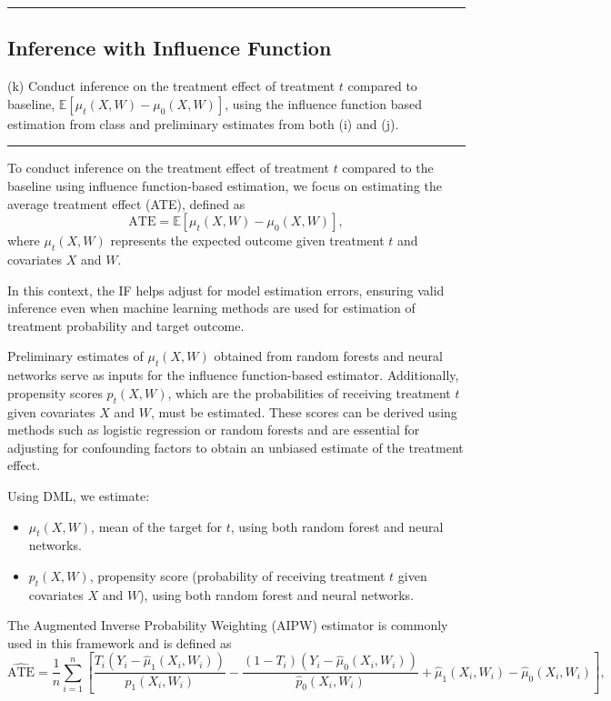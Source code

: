 \documentclass{article}
\newenvironment{colorparagraph}[1]{\par\color{#1}}{\par}
\begin{document}
\begin{colorparagraph}{questioncolor}
\label{q3k}
\rule{\textwidth}{0.5pt}
\subsection{Inference with Influence Function}
(k) Conduct inference on the treatment effect of treatment \( t \) compared to baseline, \( \mathbb{E}[\mu_t(X, W) - \mu_0(X, W)] \), using the influence function based estimation from class and preliminary estimates from both (i) and (j).

\rule{\textwidth}{0.5pt}
\end{colorparagraph}

To conduct inference on the treatment effect of treatment \( t \) compared to the baseline using influence function-based estimation, we focus on estimating the average treatment effect (ATE), defined as
\[
\text{ATE} = \mathbb{E}[\mu_t(X, W) - \mu_0(X, W)],
\]
where \( \mu_t(X, W) \) represents the expected outcome given treatment \( t \) and covariates \( X \) and \( W \).

In this context, the IF helps adjust for model estimation errors, ensuring valid inference even when machine learning methods are used for estimation of treatment probability and target outcome.

Preliminary estimates of \( \mu_t(X, W) \) obtained from random forests and neural networks serve as inputs for the influence function-based estimator. Additionally, propensity scores \( p_t(X, W) \), which are the probabilities of receiving treatment \( t \) given covariates \( X \) and \( W \), must be estimated. These scores can be derived using methods such as logistic regression or random forests and are essential for adjusting for confounding factors to obtain an unbiased estimate of the treatment effect.

Using DML, we estimate:

\begin{itemize}
  \item \( \mu_t(X, W) \), mean of the target for $t$, using both random forest and neural networks.
  \item \( p_t(X, W) \), propensity score (probability of receiving treatment $t$ given covariates \( X \) and \( W \)), using both random forest and neural networks.
\end{itemize}

The Augmented Inverse Probability Weighting (AIPW) estimator is commonly used in this framework and is defined as
\[
\hat{\text{ATE}} = \frac{1}{n} \sum_{i=1}^n \left[ \frac{T_i (Y_i - \hat{\mu}_1(X_i, W_i))}{\hat{p}_1(X_i, W_i)} - \frac{(1 - T_i) (Y_i - \hat{\mu}_0(X_i, W_i))}{\hat{p}_0(X_i, W_i)} + \hat{\mu}_1(X_i, W_i) - \hat{\mu}_0(X_i, W_i) \right],
\]
\end{document}
